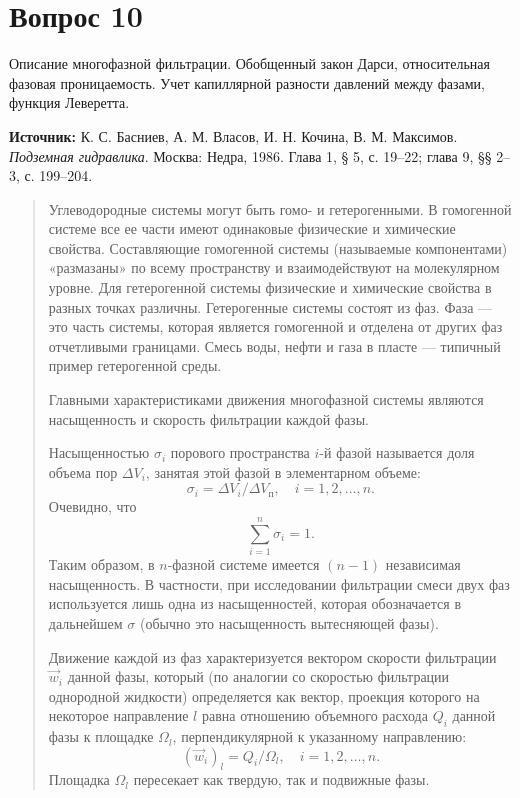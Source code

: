 \documentclass[12pt,a4paper]{article}
\begin{document}
\section*{Вопрос 10}
Описание многофазной фильтрации. Обобщенный закон Дарси, относительная фазовая проницаемость. Учет капиллярной разности давлений между фазами, функция Леверетта.

\medskip
\noindent\textbf{Источник:} К. С. Басниев, А. М. Власов, И. Н. Кочина, В. М. Максимов. \textit{Подземная гидравлика}. Москва: Недра, 1986. Глава 1, § 5, с. 19--22; глава 9, §§ 2--3, с. 199--204.
\par\bigskip
\begin{quote}\sloppy
Углеводородные системы могут быть гомо- и гетерогенными. В гомогенной системе все ее части имеют одинаковые физические и химические свойства. Составляющие гомогенной системы (называемые компонентами) «размазаны» по всему пространству и взаимодействуют на молекулярном уровне. Для гетерогенной системы физические и химические свойства в разных точках различны. Гетерогенные системы состоят из фаз. Фаза --- это часть системы, которая является гомогенной и отделена от других фаз отчетливыми границами. Смесь воды, нефти и газа в пласте --- типичный пример гетерогенной среды.

Главными характеристиками движения многофазной системы являются насыщенность и скорость фильтрации каждой фазы.

Насыщенностью $\sigma_i$ порового пространства $i$-й фазой называется доля объема пор $\Delta V_i$, занятая этой фазой в элементарном объеме:
\begin{equation}\sigma_i=\Delta V_i/\Delta V_\text{п},\quad i=1,2,\ldots,n.\tag{9.1}\label{q10:eq-9-1}\end{equation}
Очевидно, что
\begin{equation}\sum_{i=1}^n\sigma_i=1.\tag{9.2}\label{q10:eq-9-2}\end{equation}
Таким образом, в $n$-фазной системе имеется $(n-1)$ независимая насыщенность. В частности, при исследовании фильтрации смеси двух фаз используется лишь одна из насыщенностей, которая обозначается в дальнейшем $\sigma$ (обычно это насыщенность вытесняющей фазы).

Движение каждой из фаз характеризуется вектором скорости фильтрации $\vec w_i$ данной фазы, который (по аналогии со скоростью фильтрации однородной жидкости) определяется как вектор, проекция которого на некоторое направление $l$ равна отношению объемного расхода $Q_i$ данной фазы к площадке $\Omega_l$, перпендикулярной к указанному направлению:
\begin{equation}(\vec w_i)_l=Q_i/\Omega_l,\quad i=1,2,\ldots,n.\tag{9.3}\label{q10:eq-9-3}\end{equation}
Площадка $\Omega_l$ пересекает как твердую, так и подвижные фазы.
\par\nobreak{}\par
\end{quote}
\end{document}
